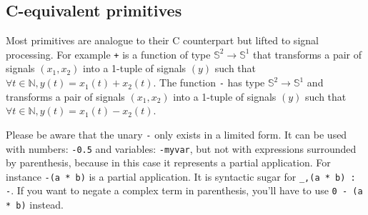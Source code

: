 \subsection{C-equivalent primitives}

Most \faust primitives are analogue to their C counterpart but lifted to signal processing.
For example \lstinline|+| is a function of type $\mathbb{S}^{2}\rightarrow\mathbb{S}^{1}$ that transforms a pair of signals $(x_1,x_2)$ into a 1-tuple of signals $(y)$ such that $\forall t\in\mathbb{N}, y(t)=x_{1}(t)+x_{2}(t)$. The function \lstinline|-| has type $\mathbb{S}^{2}\rightarrow\mathbb{S}^{1}$ and transforms a pair of signals $(x_1,x_2)$ into a 1-tuple of signals $(y)$ such that $\forall t\in\mathbb{N}, y(t)=x_{1}(t)-x_{2}(t)$. 

Please be aware that the unary \lstinline|-| only exists in a limited form. It can be used with numbers: \lstinline|-0.5| and variables: \lstinline|-myvar|, but not with expressions surrounded by parenthesis, because in this case it represents a partial application.  For instance   \lstinline|-(a * b)| is a partial application. It is syntactic sugar for \lstinline|_,(a * b) : -|. If you want to negate a complex term in parenthesis, you'll have to use \lstinline|0 - (a * b)| instead.

\bigskip

